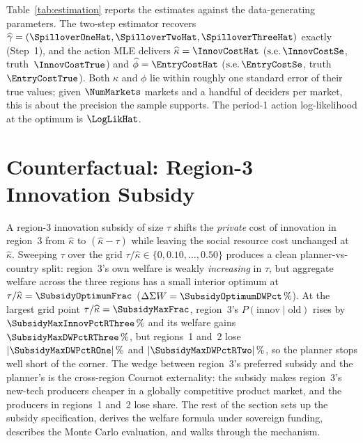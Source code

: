 \documentclass[12pt]{article}
\begin{document}
Table~\ref{tab:estimation} reports the estimates against the
data-generating parameters. The two-step estimator recovers
$\widehat{\gamma} = (\SpilloverOneHat, \SpilloverTwoHat, \SpilloverThreeHat)$
exactly (Step~1), and the action MLE delivers $\widehat{\kappa} = \InnovCostHat$
($\text{s.e.}\,\InnovCostSe$, truth~$\InnovCostTrue$) and
$\widehat{\phi} = \EntryCostHat$ ($\text{s.e.}\,\EntryCostSe$,
truth~$\EntryCostTrue$). Both $\kappa$ and $\phi$ lie within roughly one
standard error of their true values; given $\NumMarkets$ markets and a
handful of deciders per market, this is about the precision the sample
supports. The period-1 action log-likelihood at the optimum is $\LogLikHat$.\\

\begin{table}[ht]
  \centering
  \caption{Two-step estimation of $(\gamma, \kappa, \phi)$}
  \medskip
  \label{tab:estimation}
  
  \caption*{\footnotesize Notes: Estimates from \NumMarkets\ simulated markets.
    Step~1 identifies $\gamma$ from Cournot quantities; Step~2 estimates
    $(\kappa, \phi)$ by period-1 action MLE conditional on $\widehat{\gamma}$.
    Standard errors (BHHH) are reported only for the MLE step.}
\end{table}

\section{Counterfactual: Region-3 Innovation Subsidy}
\label{sec:subsidy}

A region-3 innovation subsidy of size $\tau$ shifts the \emph{private}
cost of innovation in region~3 from $\widehat{\kappa}$ to
$(\widehat{\kappa} - \tau)$ while leaving the social resource cost
unchanged at $\widehat{\kappa}$. Sweeping $\tau$ over the grid
$\tau / \widehat{\kappa} \in \{0, 0.10, \ldots, 0.50\}$ produces a
clean planner-vs-country split: region~3's own welfare is weakly
\emph{increasing} in $\tau$, but aggregate welfare across the three
regions has a small interior optimum at
$\tau / \widehat{\kappa} = \SubsidyOptimumFrac$
($\Delta\Sigma W = \SubsidyOptimumDWPct\,\%$). At the largest grid
point $\tau / \widehat{\kappa} = \SubsidyMaxFrac$, region~3's
$P(\mathrm{innov} \mid \mathrm{old})$ rises by
$\SubsidyMaxInnovPctRThree\,\%$ and its welfare gains
$\SubsidyMaxDWPctRThree\,\%$, but regions~1 and~2 lose
$|\SubsidyMaxDWPctROne|\,\%$ and $|\SubsidyMaxDWPctRTwo|\,\%$, so the
planner stops well short of the corner. The wedge between region~3's
preferred subsidy and the planner's is the cross-region Cournot
externality: the subsidy makes region~3's new-tech producers cheaper
in a globally competitive product market, and the producers in
regions~1 and~2 lose share. The rest of the section sets up the
subsidy specification, derives the welfare formula under sovereign
funding, describes the Monte Carlo evaluation, and walks through the
mechanism.
\end{document}
